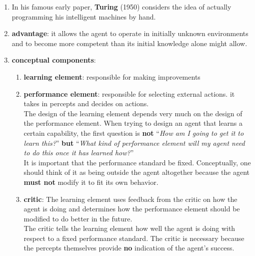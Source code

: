 \begin{enumerate}
    \item In his famous early paper, \textbf{Turing} (1950) considers the idea of actually programming his intelligent machines by hand.
    \hfill \cite{ai/book/Artificial-Intelligence-A-Modern-Approach/Russell-Norvig}

    \item  \textbf{advantage}: it allows the agent to operate in initially unknown environments and to become more competent than its initial knowledge alone might allow.
    \hfill \cite{ai/book/Artificial-Intelligence-A-Modern-Approach/Russell-Norvig}

    \item \textbf{conceptual components}:
    \begin{enumerate}
        \item \textbf{learning element}: responsible for making improvements
        \hfill \cite{ai/book/Artificial-Intelligence-A-Modern-Approach/Russell-Norvig}

        \item \textbf{performance element}: responsible for selecting external actions. it takes in percepts and decides on actions.
        \hfill \cite{ai/book/Artificial-Intelligence-A-Modern-Approach/Russell-Norvig}
        \\
        The design of the learning element depends very much on the design of the performance element. When trying to design an agent that learns a certain capability, the first question is \textbf{not} “\textit{How am I going to get it to learn this?}” \textbf{but} “\textit{What kind of performance element will my agent need to do this once it has learned how?}”
        \hfill \cite{ai/book/Artificial-Intelligence-A-Modern-Approach/Russell-Norvig}
        \\
        It is important that the performance standard be fixed. Conceptually, one should think of it as being outside the agent altogether because the agent \textbf{must not} modify it to fit its own behavior.
        \hfill \cite{ai/book/Artificial-Intelligence-A-Modern-Approach/Russell-Norvig}

        \item \textbf{critic}: The learning element uses feedback from the critic on how the agent is doing and determines how the performance element should be modified to do better in the future. 
        \hfill \cite{ai/book/Artificial-Intelligence-A-Modern-Approach/Russell-Norvig}
        \\
        The critic tells the learning element how well the agent is doing with respect to a fixed performance standard. The critic is necessary because the percepts themselves provide \textbf{no} indication of the agent’s success.
        \hfill \cite{ai/book/Artificial-Intelligence-A-Modern-Approach/Russell-Norvig}


\end{enumerate}
\end{enumerate}
